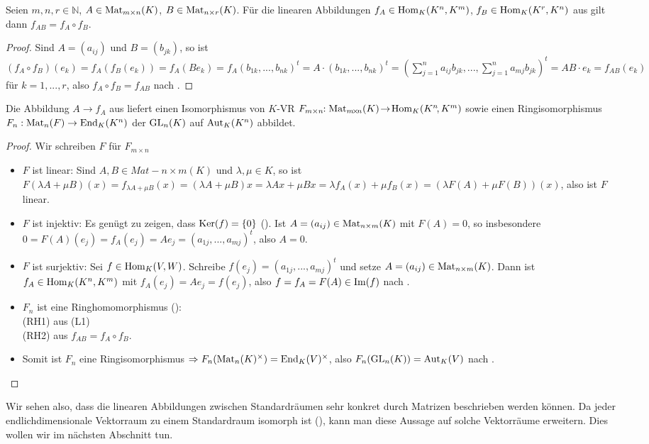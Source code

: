 \begin{lemma}
	Seien $m,n,r\in \mathbb N$, $A\in \operatorname{Mat}_{m\times n}(K)$, $B\in \operatorname{Mat}_{n\times r}(K)$. Für die linearen 
	Abbildungen $f_A\in \operatorname{Hom}_K(K^n,K^m)$, $f_B\in \operatorname{Hom}_K(K^r,K^n)$ aus  gilt dann $f_{AB}=f_A\circ f_B$.
\end{lemma}
\begin{proof}
	Sind $A=(a_{ij})$ und $B=(b_{jk})$, so ist $(f_A\circ f_B)(e_k)=f_A(f_B(e_k))=f_A(Be_k)=f_A(b_{1k},...,b_{nk})^t=
	A\cdot (b_{1k},...,b_{nk})^t=(\sum_{j=1}^n a_{ij}b_{jk},...,\sum_{j=1}^n a_{mj}b_{jk})^t=AB\cdot e_k=
	f_{AB}(e_k)$ für $k=1,...,r$, also $f_A\circ f_B=f_{AB}$ nach .
\end{proof}

\begin{proposition}
	Die Abbildung $A\to f_A$ aus  liefert einen Isomorphismus von $K$-VR $F_{m\times n}\!\!: \operatorname{Mat}_{m\!\times\!n}(K)
	\!\to\! \operatorname{Hom}_K(K^n\!,K^m)$ sowie einen Ringisomorphismus $F_n:\operatorname{Mat}_n(F)\to \operatorname{End}_K(K^n)$ der $\operatorname{GL}_n(K)$ auf $\operatorname{Aut}_K(K^n)$ 
	abbildet.
\end{proposition}
\begin{proof}
	Wir schreiben $F$ für $F_{m\times n}$
	\begin{itemize}
		\item $F$ ist linear: Sind $A,B\in Mat-{n\times m}(K)$ und $\lambda,\mu\in K$, so ist $F(\lambda A+\mu B)(x)=
		f_{\lambda A+\mu B}(x)=(\lambda A+\mu B)x=\lambda Ax+\mu Bx=\lambda f_A(x)+\mu f_B(x)=(\lambda F(A)+\mu F(B))(x)$, 
		also ist $F$ linear.
		\item $F$ ist injektiv: Es genügt zu zeigen, dass $\operatorname{Ker}(f)=\{0\}$ (). Ist $A=(a_{ij})\in \operatorname{Mat}_{n\times m}(K)$ mit $F(A)=0$, 
		so insbesondere $0=F(A)(e_j)=f_A(e_j)=Ae_j=(a_{1j},...,a_{mj})^t$, also $A=0$.
		\item $F$ ist surjektiv: Sei $f\in \operatorname{Hom}_K(V,W)$. Schreibe $f(e_j)=(a_{1j},...,a_{mj})^t$ und setze $A=(a_{ij})\in 
		\operatorname{Mat}_{n\times m}(K)$. Dann ist $f_A\in \operatorname{Hom}_K(K^n,K^m)$ mit $f_A(e_j)=Ae_j=f(e_j)$, also $f=f_A=F(A)\in \operatorname{Im}(f)$ nach .
		\item $F_n$ ist eine Ringhomomorphismus (): \\
		(RH1) aus (L1) \\
		(RH2) aus $f_{AB}=f_A\circ f_B$.
		\item Somit ist $F_n$ eine Ringisomorphismus $\Rightarrow F_n(\operatorname{Mat}_n(K)^{\times})=\operatorname{End}_K(V)^{\times}$, also $F_n(
		\operatorname{GL}_n(K))=\operatorname{Aut}_K(V)$ nach .
	\end{itemize}
\end{proof}

\begin{remark}
	Wir sehen also, dass die linearen Abbildungen zwischen Standardräumen sehr konkret durch Matrizen beschrieben werden können. Da jeder endlichdimensionale Vektorraum zu einem Standardraum isomorph ist (), kann man diese Aussage auf solche Vektorräume erweitern. Dies wollen wir im nächsten Abschnitt tun.
\end{remark}
